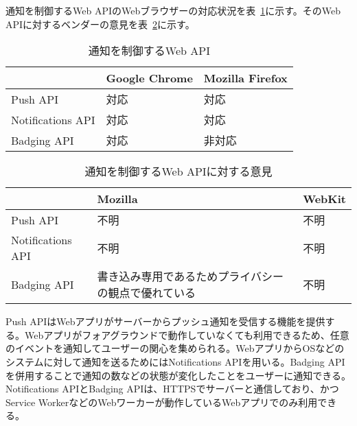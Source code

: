 通知を制御するWeb APIのWebブラウザーの対応状況を表~\ref{table:通知を制御するWeb API}に示す。そのWeb APIに対するベンダーの意見を表~\ref{table:通知を制御するWeb APIに対する意見}に示す。
\begin{table}
  \caption{通知を制御するWeb API}
  \label{table:通知を制御するWeb API}
  \centering
  \begin{tabular}{|p{13em}|p{8em}|p{8em}|}
    \hline
    & Google Chrome & Mozilla Firefox \\ \hline
    Push API & \cellcolor{gray!10}対応 & \cellcolor{gray!10}対応 \\ \hline
    Notifications API & \cellcolor{gray!10}対応 & \cellcolor{gray!10}対応 \\ \hline
    Badging API & \cellcolor{gray!10}対応 & \cellcolor{gray!30}非対応 \\ \hline
  \end{tabular}
\end{table}
\begin{table}
  \caption{通知を制御するWeb APIに対する意見}
  \label{table:通知を制御するWeb APIに対する意見}
    \centering
    \begin{tabular}{|p{13em}|p{13em}|p{13em}|}
        \hline
        & Mozilla & WebKit \\ \hline
        Push API & 不明 & 不明 \\ \hline
        Notifications API & 不明 & 不明 \\ \hline
        Badging API & \cellcolor{gray!10}書き込み専用であるためプライバシーの観点で優れている~\cite{MozillaBadgingAPI} & 不明 \\ \hline
    \end{tabular}
\end{table}
Push APIはWebアプリがサーバーからプッシュ通知を受信する機能を提供する。Webアプリがフォアグラウンドで動作していなくても利用できるため、任意のイベントを通知してユーザーの関心を集められる。WebアプリからOSなどのシステムに対して通知を送るためにはNotifications APIを用いる。Badging APIを併用することで通知の数などの状態が変化したことをユーザーに通知できる。Notifications APIとBadging APIは、HTTPSでサーバーと通信しており、かつService WorkerなどのWebワーカーが動作しているWebアプリでのみ利用できる。
